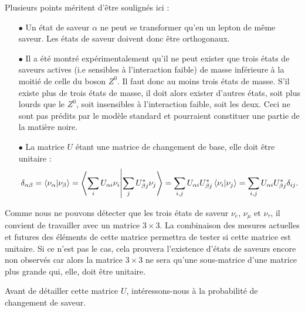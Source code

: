         Plusieurs points méritent d'être soulignés ici :
        \begin{itemize}
          \item[$\bullet$] Un état de saveur $\alpha$ ne peut se transformer qu'en un lepton de même saveur. Les états de saveur doivent donc être orthogonaux.
          \item[$\bullet$] Il a été montré expérimentalement qu'il ne peut exister que trois états de saveurs actives (i.e sensibles à l'interaction faible)\cite{pdg2018} de masse inférieure à la moitié de celle du boson $Z^0$. Il faut donc au moins trois états de masse. S'il existe plus de trois états de masse, il doit alors exister d'autres états, soit plus lourds que le $Z^0$, soit insensibles à l'interaction faible, soit les deux. Ceci ne sont pas prédits par le modèle standard et pourraient constituer une partie de la matière noire.
          \item[$\bullet$] La matrice $U$ étant une matrice de changement de base, elle doit être unitaire :
          \begin{equation*}
            \delta_{\alpha\beta} = \braket{\nu_{\alpha}}{\nu_{\beta}} = \braket{\sum_i U_{\alpha i}\nu_i}{\sum_j U_{\beta j}^*\nu_j} = \sum_{i,j} U_{\alpha i}U_{\beta j}^* \braket{\nu_i}{\nu_j} = \sum_{i,j} U_{\alpha i}U_{\beta j}^* \delta_{ij}.
          \end{equation*}
        \end{itemize}
        Comme nous ne pouvons détecter que les trois états de saveur $\nu_e$, $\nu_{\mu}$ et $\nu_{\tau}$, il convient de travailler avec un matrice $3\times3$. La combinaison des mesures actuelles et futures des éléments de cette matrice\cite{Qian2013} permettra de tester si cette matrice est unitaire. Si ce n'est pas le cas, cela prouvera l'existence d'états de saveurs encore non observés car alors la matrice $3\times3$ ne sera qu'une sous-matrice d'une matrice plus grande qui, elle, doit être unitaire.
        
        Avant de détailler cette matrice $U$, intéressons-nous à la probabilité de changement de saveur.

